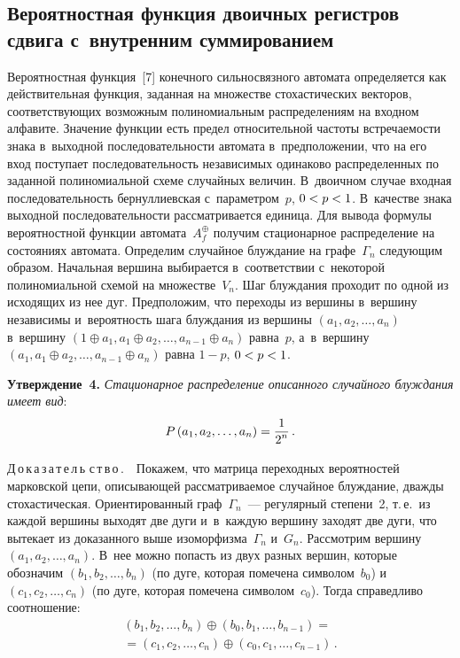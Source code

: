 \begin{multicols}{2}
\section{Вероятностная функция двоичных регистров сдвига 
с~внутренним суммированием}

  
  Вероятностная функция~[7] конечного сильносвязного автомата определяется 
как действительная функция, заданная на множестве стохастических векторов, 
соответствующих возможным \mbox{полиномиальным} распределениям на входном 
алфавите. Значение функции есть предел относительной частоты встречаемости 
знака в~выходной последовательности автомата в~предположении, что на его 
вход поступает последовательность независимых одинаково распределенных по 
заданной полиномиальной схеме случайных величин. В~двоичном случае 
входная последовательность бернуллиевская с~параметром~$p$, $0\hm< p 
\hm<1$. В~качестве знака выходной последовательности рассматривается 
единица. Для вывода формулы вероятностной функции 
автомата~$A_f^{\oplus}$ получим стационарное распределение на состояниях 
автомата. Определим случайное блуж\-да\-ние на графе~$\Gamma_n$ следующим 
образом. Начальная вершина выбирается в~соответствии с~некоторой 
полиномиальной схемой на множестве~$V_n$. Шаг блуждания проходит по 
одной из исходящих из нее дуг. Предположим, что переходы из вершины 
в~вершину независимы и~вероятность шага блуждания из вершины $(a_1, a_2, 
\ldots , a_n)$ в~вершину 
$(1\oplus a_1, a_1\oplus a_2,\ldots , a_{n-1}\oplus a_n)$ 
равна~$p$, а~в~вершину $(a_1,a_1\oplus a_2,\ldots ,  
a_{n-1}\oplus a_{n})$ равна $1-p$, $0\hm< p\hm<1$. 
  
  \smallskip
  
  \noindent
  \textbf{Утверждение~4.} \textit{Стационарное распределение описанного 
случайного блуждания имеет вид}:
  $$
  P\left( a_1, a_2,\ldots , a_n\right)=\displaystyle\frac{\displaystyle 1\mathstrut}{\displaystyle 2^n\mathstrut}\,.
  $$
  
  
  \noindent
  Д\,о\,к\,а\,з\,а\,т\,е\,л\,ь\,\,с\,т\,в\,о\,.\ \ Покажем, что матрица переходных 
вероятностей марковской цепи, опи\-сы\-ва\-ющей рассматриваемое случайное 
блуждание, дваж\-ды стохастическая. Ориентированный граф~$\Gamma_n$~--- 
регулярный степени~2, т.\,е.\ из каждой вершины выходят две дуги и~в~каждую 
вершину заходят две дуги, что вытекает из доказанного выше 
изоморфизма~$\Gamma_n$ и~$G_n$. Рассмотрим вершину $(a_1, a_2, \ldots , 
a_n)$. В~нее можно попасть из двух разных вершин, которые обозначим 
$(b_1,b_2,\ldots , b_n)$ (по дуге, которая помечена символом~$b_0$) 
и~$(c_1,c_2,\ldots ,c_n)$ (по дуге, которая помечена символом~$c_0$). Тогда 
справедливо соотношение:
\begin{multline*}
  (b_1,b_2,\ldots , b_n)\oplus (b_0,b_1,\ldots , b_{n-1})= {}\\
  {}=(c_1,c_2,\ldots , c_n)\oplus (c_0,c_1,\ldots , c_{n-1})\,.
\end{multline*}
  

\end{multicols}
